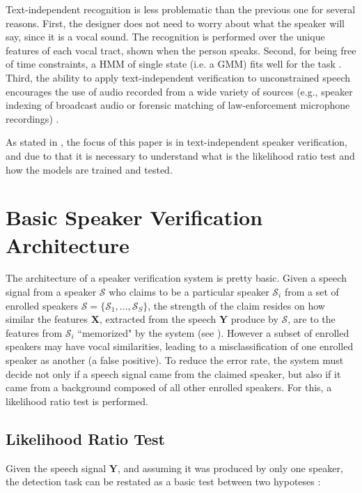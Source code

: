 Text-independent recognition is less problematic than the previous one for several reasons. First, the designer does not need to worry about what the speaker will say, since it is a vocal sound. The recognition is performed over the unique features of each vocal tract, shown when the person speaks. Second, for being free of time constraints, a HMM of single state (i.e. a GMM) fits well for the task \cite{hebert.2008}. Third, the ability to apply text-independent verification to unconstrained speech encourages the use of audio recorded from a wide variety of sources (e.g., speaker indexing of broadcast audio or forensic matching of law-enforcement microphone recordings) \cite{reynolds.campbell.2008}.

As stated in , the focus of this paper is in text-independent speaker verification, and due to that it is necessary to understand what is the likelihood ratio test and how the models are trained and tested.

\section{Basic Speaker Verification Architecture}

The architecture of a speaker verification system is pretty basic. Given a speech signal from a speaker $\mathcal{S}$ who claims to be a particular speaker $\mathcal{S}_i$ from a set of enrolled speakers $\boldsymbol{\mathcal{S}} = \{\mathcal{S}_1, ..., \mathcal{S}_S\}$, the strength of the claim resides on how similar the features $\boldsymbol{X}$, extracted from the speech $\boldsymbol{Y}$ produce by $\mathcal{S}$, are to the features from $\mathcal{S}_i$ ``memorized" by the system (see ). However a subset of enrolled speakers may have vocal similarities, leading to a misclassification of one enrolled speaker as another (a false positive). To reduce the error rate, the system must decide not only if a speech signal came from the claimed speaker, but also if it came from a background composed of all other enrolled speakers. For this, a likelihood ratio test is performed.

\subsection{Likelihood Ratio Test}

Given the speech signal $\boldsymbol{Y}$, and assuming it was produced by only one speaker, the detection task can be restated as a basic test between two hypoteses \cite{reynolds.1995b}:

